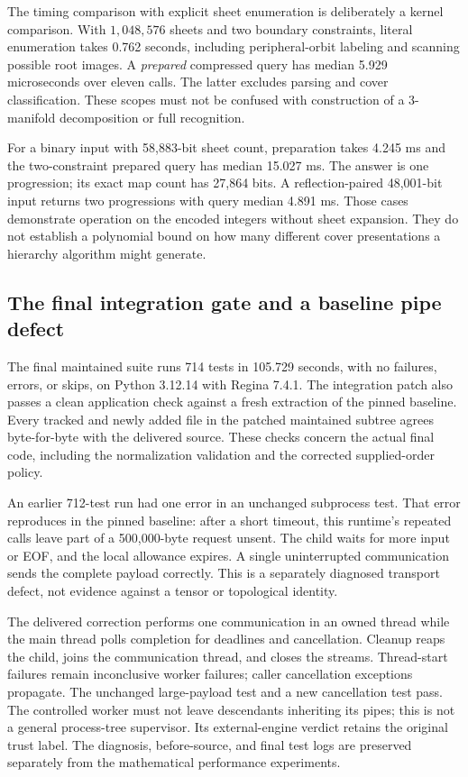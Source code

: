 \documentclass[11pt]{article}
\theoremstyle{definition}
\theoremstyle{remark}
\newcommand{\code}[1]{\texttt{\detokenize{#1}}}
\begin{document}
The timing comparison with explicit sheet enumeration is deliberately a
kernel comparison. With $1,048,576$ sheets and two boundary constraints,
literal enumeration takes 0.762 seconds, including peripheral-orbit
labeling and scanning possible root images. A \emph{prepared} compressed
query has median 5.929 microseconds over eleven calls. The latter excludes
parsing and cover classification. These scopes must not be confused with construction of a
3-manifold decomposition or full recognition.

For a binary input with 58,883-bit sheet count, preparation takes 4.245 ms
and the two-constraint prepared query has median 15.027 ms. The answer is
one progression; its exact map count has 27,864 bits. A reflection-paired
48,001-bit input returns two progressions with query median 4.891 ms.
Those cases demonstrate operation on the encoded integers without sheet
expansion. They do not establish a polynomial bound on how many different
cover presentations a hierarchy algorithm might generate.

\subsection{The final integration gate and a baseline pipe defect}

The final maintained suite runs 714 tests in 105.729 seconds, with no
failures, errors, or skips, on Python 3.12.14 with Regina 7.4.1. The
integration patch also passes a clean application check against a fresh
extraction of the pinned baseline. Every tracked and newly added file in
the patched maintained subtree agrees byte-for-byte with the delivered
source. These checks concern the actual final code, including the
normalization validation and the corrected supplied-order policy.

An earlier 712-test run had one error in an unchanged subprocess test.
That error reproduces in the pinned baseline: after a short timeout, this
runtime's repeated \code{communicate(None)} calls leave part of a
500,000-byte request unsent. The child waits for more input or EOF, and
the local allowance expires. A single uninterrupted communication sends
the complete payload correctly. This is a separately diagnosed transport
defect, not evidence against a tensor or topological identity.

The delivered correction performs one communication in an owned thread
while the main thread polls completion for deadlines and cancellation.
Cleanup reaps the child, joins the communication thread, and closes the
streams. Thread-start failures remain inconclusive worker failures;
caller cancellation exceptions propagate. The unchanged large-payload
test and a new cancellation test pass. The controlled worker must not
leave descendants inheriting its pipes; this is not a general process-tree
supervisor. Its external-engine verdict retains the original trust label.
The diagnosis, before-source, and final test logs are preserved separately
from the mathematical performance experiments.
\end{document}
